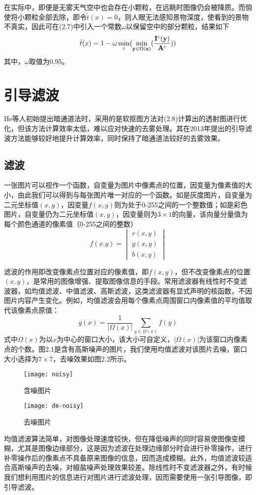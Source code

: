 \documentclass[a4paper, 12pt, oneside]{report}
\begin{document}
{在实际中，即便是无雾天气空中也会存在小颗粒，在远眺时图像仍会被降质。而倘使将小颗粒全部去除，即令$\tilde{t}(x) = 0$，则人眼无法感知景物深度，使看到的景物不真实，因此可在(2.7)中引入一个常数$\omega$以保留空中的部分颗粒，结果如下
\begin{equation}
\tilde{t}(x) = 1 - \omega\min_c(\min_{{\bf y} \in \Omega({\bf x})}(\frac{{\bf I}^c({\bf y})}{{\bf A}^c}))
\end{equation}
其中，$\omega$取值为0.95。

\section{引导滤波\quad}
He等人初始提出暗通道法时，采用的是软抠图方法对(2.8)计算出的透射图进行优化，但该方法计算效率太低，难以应对快速的去雾处理。其在2013年提出的引导滤波\cite{ref13}方法能够较好地提升计算效率，同时保持了暗通道法较好的去雾效果。

\subsection{滤波\quad}
一张图片可以视作一个函数，自变量为图片中像素点的位置，因变量为像素值的大小，由此我们可以得到与每张图片唯一对应的一个函数。如是灰度图片，自变量为二元坐标值$(x, y)$，因变量$f(x, y)$则为处于0-255之间的一个整数值；如是彩色图片，自变量仍为二元坐标值$(x, y)$，因变量则为$3\times 1$的向量，该向量分量值为每个颜色通道的像素值（0-255之间的整数）
$$ f(x. y) = 
\begin{vmatrix}
  r(x, y) \\
  g(x, y) \\
  b(x, y)  
\end{vmatrix}
$$

滤波的作用即改变像素点位置对应的像素值，即$f(x,y)$，但不改变像素点的位置$(x,y)$，是常用的图像增强、提取图像信息的手段。常用滤波器有线性时不变滤波器，如均值滤波、中值滤波、高斯滤波，这类滤波器有显式声明的核函数，不因图片内容产生变化。例如，均值滤波会用每个像素点周围窗口内像素值的平均值取代该像素点原值：
$$g(x) = \frac{1}{|\Omega(x)|}\sum_{y \in \Omega(x)}f(y)$$
式中$\Omega(x)$为以$x$为中心的窗口大小，该大小可自定义，$|\Omega(x)|$为该窗口内像素点的个数。图2.1是含有高斯噪声的图片，我们使用均值滤波对该图片去噪，窗口大小选择为$7\times 7$，去噪效果如图2.2所示。
\begin{figure}[htbp]
\centering
\begin{minipage}[t]{0.48\textwidth}
\centering
\texttt{[image: noisy]}
\caption{含噪图片}
\end{minipage}
\begin{minipage}[t]{0.48\textwidth}
\centering
\texttt{[image: de-noisy]}
\caption{去噪图片}
\end{minipage}
\end{figure}
均值滤波算法简单，对图像处理速度较快，但在降低噪声的同时容易使图像变模糊，尤其是图像边缘部分，这是因为滤波在处理边缘部分时会进行补零操作，进行补零操作后的像素点不具备原来图像的信息，因而造成模糊。此外，均值滤波较适合高斯噪声的去噪，对椒盐噪声处理效果较差。除线性时不变滤波器之外，有时候我们想利用图片的信息进行对图片进行滤波处理，因而需要使用一张引导图像，即引导滤波。

}
\end{document}

